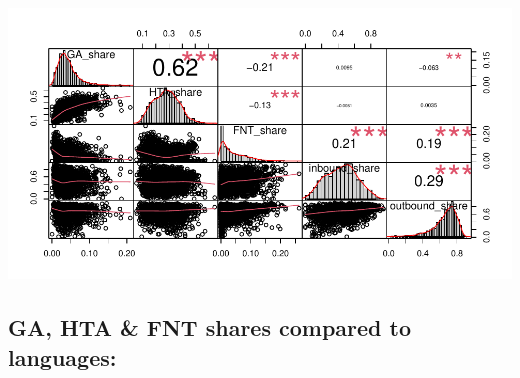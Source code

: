 \documentclass[
]{article}
\begin{document}
\includegraphics{Lin_Mod_Clus_Analysis_files/figure-latex/unnamed-chunk-16-1.pdf}

\hypertarget{ga-hta-fnt-shares-compared-to-languages}{%
\subsection{GA, HTA \& FNT shares compared to
languages:}\label{ga-hta-fnt-shares-compared-to-languages}}
\end{document}
